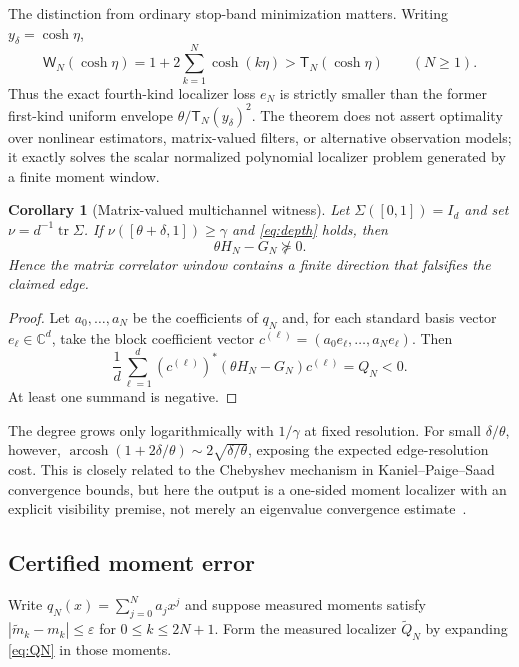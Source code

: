 \documentclass[11pt]{article}
\newtheorem{corollary}[theorem]{Corollary}
\theoremstyle{definition}
\theoremstyle{remark}
\newcommand{\C}{\mathbb C}
\newcommand{\tr}{\operatorname{tr}}
\newcommand{\eps}{\varepsilon}
\begin{document}
The distinction from ordinary stop-band minimization matters.  Writing
$y_\delta=\cosh\eta$,
\begin{equation}
 \mathsf W_N(\cosh\eta)=1+2\sum_{k=1}^N\cosh(k\eta)
 >\mathsf T_N(\cosh\eta)\qquad(N\geq1).               \label{eq:WbeatsT}
\end{equation}
Thus the exact fourth-kind localizer loss $e_N$ is strictly smaller than the
former first-kind uniform envelope $\theta/\mathsf T_N(y_\delta)^2$.
The theorem does not assert optimality over nonlinear estimators,
matrix-valued filters, or alternative observation models; it exactly solves
the scalar normalized polynomial localizer problem generated by a finite
moment window.

\begin{corollary}[Matrix-valued multichannel witness]    \label{cor:matrixcheb}
Let $\Sigma([0,1])=I_d$ and set
$\nu=d^{-1}\tr\Sigma$.  If
$\nu([\theta+\delta,1])\geq\gamma$ and \cref{eq:depth} holds, then
\begin{equation}
 \theta H_N-G_N\not\succeq0.
\end{equation}
Hence the matrix correlator window contains a finite direction that falsifies
the claimed edge.
\end{corollary}

\begin{proof}
Let $a_0,\ldots,a_N$ be the coefficients of $q_N$ and, for each standard basis
vector $e_\ell\in\C^d$, take the block coefficient vector
$c^{(\ell)}=(a_0e_\ell,\ldots,a_Ne_\ell)$.  Then
\[
 \frac1d\sum_{\ell=1}^d
 (c^{(\ell)})^*(\theta H_N-G_N)c^{(\ell)}=Q_N<0.
\]
At least one summand is negative.
\end{proof}

The degree grows only logarithmically with $1/\gamma$ at fixed resolution.
For small $\delta/\theta$, however,
$\operatorname{arcosh}(1+2\delta/\theta)\sim2\sqrt{\delta/\theta}$,
exposing the expected edge-resolution cost.  This is closely related to the
Chebyshev mechanism in Kaniel--Paige--Saad convergence bounds, but here the
output is a one-sided moment localizer with an explicit visibility premise,
not merely an eigenvalue convergence estimate~\cite{Saad1980,FilteredRR}.

\subsection{Certified moment error}

Write $q_N(x)=\sum_{j=0}^Na_jx^j$ and suppose measured moments satisfy
$|\widetilde m_k-m_k|\leq\eps$ for $0\leq k\leq2N+1$.  Form the measured
localizer $\widetilde Q_N$ by expanding \cref{eq:QN} in those moments.
\end{document}
